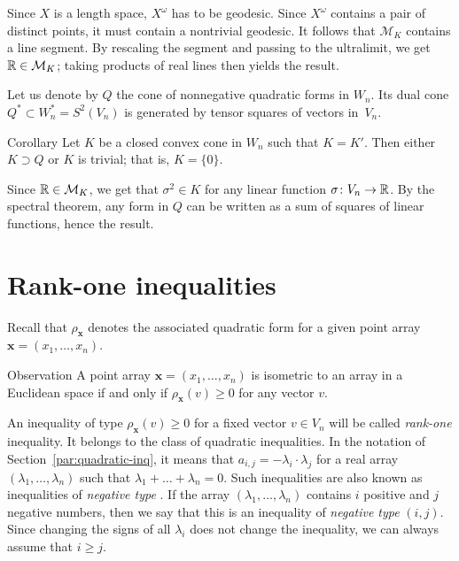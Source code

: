 \documentclass[a4paper,10pt]{article}
\begin{document}
Since  $X$ is a length space, $X^\omega$ has to be geodesic.
Since $X^\omega$
contains a pair of distinct points, it must contain a nontrivial geodesic.
It follows that $\mathcal{M}_K$ contains a line segment.
By rescaling the segment and passing to the ultralimit, we get $\mathbb{R}\in \mathcal{M}_K$;
taking products of real lines then yields the result.
\qeds

Let us denote by $Q$ the cone of nonnegative quadratic forms in $W_n$.
Its dual cone $Q^*\subset W_n^*=S^2(V_n)$ is generated by tensor squares of vectors in~$V_n$.

\begin{thm}{Corollary}
Let $K$ be a closed convex cone in $W_n$ such that $K=K'$.
Then either $K\supset Q$ or $K$ is trivial; that is, $K=\{0\}$.
\end{thm}

Since $\mathbb{R}\in \mathcal{M}_K$, we get that $\sigma^2\in K$ for any linear function $\sigma\colon V_n\to\mathbb{R}$.
By the spectral theorem, any form in $Q$ can be written as a sum of squares of linear functions, hence the result.
\qeds

\section{Rank-one inequalities}\label{par:rank-one}
Recall that $\rho_{\bm{x}}$ denotes the associated quadratic form for a given point array $\bm{x}=(x_1,\dots,x_n)$.

\begin{thm}{Observation}\label{obs:rank-one}
A point array $\bm{x}=(x_1,\dots,x_n)$ is isometric to an array in a Euclidean space if and only if $\rho_{\bm{x}}(v)\ge 0$ for any vector $v$.
\end{thm}

An inequality of type $\rho_{\bm{x}}(v)\ge 0$ for a fixed vector $v\in V_n$ will be called \emph{rank-one} inequality.
It belongs to the class of quadratic inequalities.  
In the notation of Section~\ref{par:quadratic-inq}, it means that $a_{i,j}=-\lambda_i\cdot\lambda_j$ for a real array $(\lambda_1,\dots, \lambda_n)$ such that
$\lambda_1+\dots+\lambda_n=0$.
Such inequalities are also known as inequalities of \emph{negative type} \cite{deza-lauren}.
If the array $(\lambda_1,\dots, \lambda_n)$ contains $i$ positive and $j$ negative numbers,
then we say that this is an inequality of \emph{negative type} $(i,j)$.
Since changing the signs of all $\lambda_i$ does not change the inequality, we can always assume that $i\ge j$.
\end{document}
